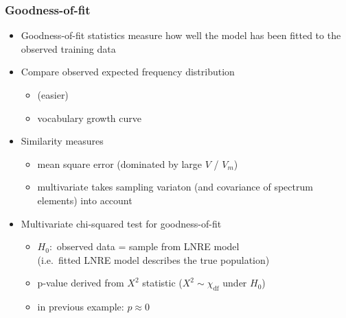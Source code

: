 \documentclass[t]{beamer} %
\begin{document}
\begin{frame}
  \frametitle{Goodness-of-fit}

  \begin{itemize}
  \item Goodness-of-fit statistics measure how well the model has been fitted to the observed training data
  \item Compare observed \vs expected frequency distribution
    \begin{itemize}
    \item {} (\so easier)
    \item vocabulary growth curve
    \end{itemize}
  \item<2-> Similarity measures
    \begin{itemize}
    \item mean square error (\so dominated by large $V$ / $V_m$)
    \item multivariate  takes sampling variaton (and covariance of spectrum elements) into account
    \end{itemize}
  \item<3-> Multivariate chi-squared test for goodness-of-fit
    \begin{itemize}
    \item $H_0:$ observed data = sample from LNRE model\\
      (i.e.\ fitted LNRE model describes the true population)
    \item p-value derived from $X^2$ statistic ($X^2 \sim \chi_{\text{df}}$ under $H_0$)
    \item in previous example: $p\approx 0$ $\quad$\sadsmilie
    \end{itemize}
  \end{itemize}
\end{frame}
\end{document}
